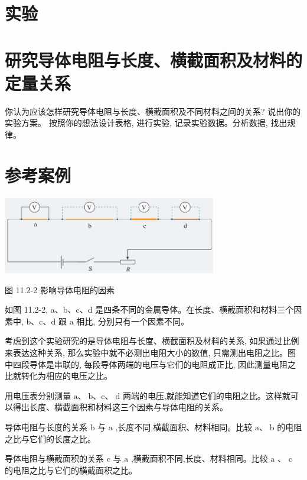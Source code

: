 \documentclass[10pt]{article}
\begin{document}
\section*{实验}

\section*{研究导体电阻与长度、横截面积及材料的定量关系}

你认为应该怎样研究导体电阻与长度、横截面积及不同材料之间的关系? 说出你的实验方案。 按照你的想法设计表格, 进行实验, 记录实验数据。分析数据, 找出规律。

\section*{参考案例}

\begin{center}
\includegraphics[max width=0.7\textwidth]{images/01911d5f-8e38-70c0-b5b8-2b399bd115b6_63_248506.jpg}
\end{center}

图 11.2-2 影响导体电阻的因素

如图 11.2-2, a、b、c、d 是四条不同的金属导体。在长度、横截面积和材料三个因素中, \(\mathrm{b}\text{、}\mathrm{c}\text{、}\mathrm{d}\) 跟 \(\mathrm{a}\) 相比, 分别只有一个因素不同。

考虑到这个实验研究的是导体电阻与长度、横截面积及材料的关系, 如果通过比例来表达这种关系, 那么实验中就不必测出电阻大小的数值, 只需测出电阻之比。图中四段导体是串联的, 每段导体两端的电压与它们的电阻成正比, 因此测量电阻之比就转化为相应的电压之比。

用电压表分别测量 \(\mathrm{a}\text{、}\mathrm{\;b}\text{、}\mathrm{c}\text{、}\mathrm{\;d}\) 两端的电压,就能知道它们的电阻之比。这样就可以得出长度、横截面积和材料这三个因素与导体电阻的关系。

导体电阻与长度的关系 \(\mathrm{b}\) 与 \(\mathrm{a}\) ,长度不同,横截面积、材料相同。比较 \(\mathrm{a}\text{、}\mathrm{\;b}\) 的电阻之比与它们的长度之比。

导体电阻与横截面积的关系 \(\mathrm{c}\) 与 \(\mathrm{a}\) ,横截面积不同,长度、材料相同。比较 \(\mathrm{a}\) 、 \(\mathrm{c}\) 的电阻之比与它们的横截面积之比。
\end{document}
